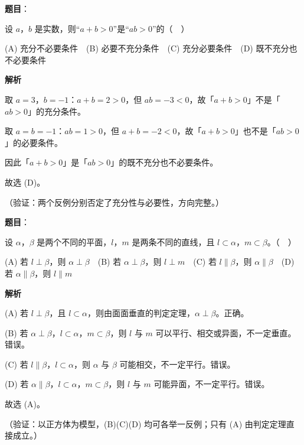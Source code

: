 \begin{answer}

\textbf{题目}：

设 \(a\)，\(b\) 是实数，则“\(a+b>0\)”是“\(ab>0\)”的（　）

(A) 充分不必要条件　(B) 必要不充分条件　(C) 充分必要条件　(D) 既不充分也不必要条件

\textbf{解析}

取 \(a=3\)，\(b=-1\)：\(a+b=2>0\)，但 \(ab=-3<0\)，故「\(a+b>0\)」不是「\(ab>0\)」的充分条件。

取 \(a=b=-1\)：\(ab=1>0\)，但 \(a+b=-2<0\)，故「\(a+b>0\)」也不是「\(ab>0\)」的必要条件。

因此「\(a+b>0\)」是「\(ab>0\)」的既不充分也不必要条件。

故选 (D)。

（验证：两个反例分别否定了充分性与必要性，方向完整。）


\end{answer}
\begin{answer}

\textbf{题目}：

设 \(\alpha\)，\(\beta\) 是两个不同的平面，\(l\)，\(m\) 是两条不同的直线，且 \(l\subset\alpha\)，\(m\subset\beta\)。（　）

(A) 若 \(l\perp\beta\)，则 \(\alpha\perp\beta\)　(B) 若 \(\alpha\perp\beta\)，则 \(l\perp m\)　(C) 若 \(l\parallel\beta\)，则 \(\alpha\parallel\beta\)　(D) 若 \(\alpha\parallel\beta\)，则 \(l\parallel m\)

\textbf{解析}

(A) 若 \(l\perp\beta\)，且 \(l\subset\alpha\)，则由面面垂直的判定定理，\(\alpha\perp\beta\)。正确。

(B) 若 \(\alpha\perp\beta\)，\(l\subset\alpha\)，\(m\subset\beta\)，则 \(l\) 与 \(m\) 可以平行、相交或异面，不一定垂直。错误。

(C) 若 \(l\parallel\beta\)，\(l\subset\alpha\)，则 \(\alpha\) 与 \(\beta\) 可能相交，不一定平行。错误。

(D) 若 \(\alpha\parallel\beta\)，\(l\subset\alpha\)，\(m\subset\beta\)，则 \(l\) 与 \(m\) 可能异面，不一定平行。错误。

故选 (A)。

（验证：以正方体为模型，(B)(C)(D) 均可各举一反例；只有 (A) 由判定定理直接成立。）


\end{answer}
